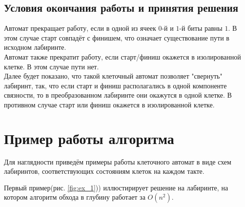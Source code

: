\documentclass[12pt]{article}
\begin{document}
\subsection*{Условия окончания работы и принятия решения}

Автомат прекращает работу, если в одной из ячеек $0$-й и $1$-й биты равны $1$. В этом случае старт совпадёт с финишем, что означает существование пути в исходном лабиринте.\\

Автомат также прекратит работу, если старт/финиш окажется в изолированной клетке. В этом случае пути нет.\\

Далее будет показано, что такой клеточный автомат позволяет "свернуть" лабиринт, так, что если старт и финиш располагались в одной компоненте связности, то в преобразованном лабиринте они окажутся в одной клетке. В противном случае старт или финиш окажется в изолированной клетке.

\section*{Пример работы алгоритма}

Для наглядности приведём примеры работы клеточного автомат в виде схем лабиринтов, соответствующих состояниям клеток на каждом такте. 

Первый пример(рис. \ref{fig:ex_1})) иллюстирирует решение на лабиринте, на котором алгоритм обхода в глубину работает за $O(n^2)$.
\end{document}
